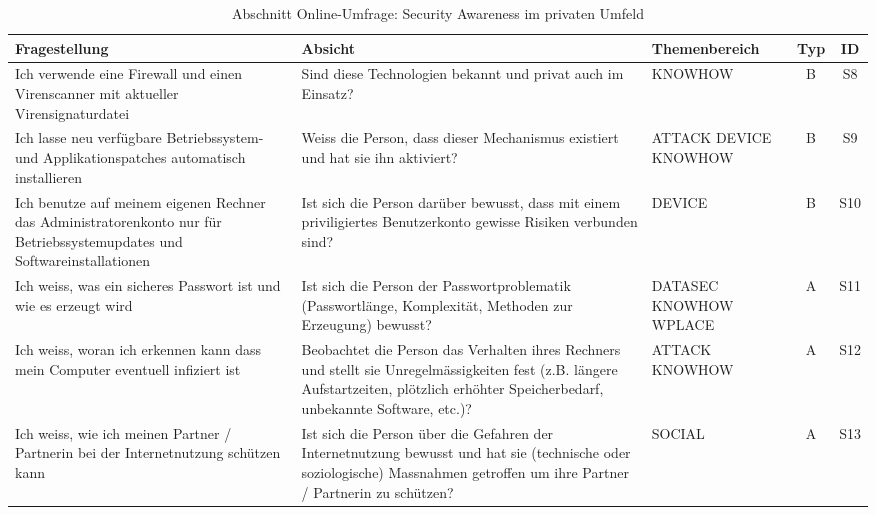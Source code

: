 \documentclass[../../main.tex]{subfiles}
\begin{document}
\sloppy 

\begin{table}[H]
\tablefontsize	
\centering
\caption{Abschnitt Online-Umfrage: Security Awareness im privaten Umfeld}
\label{Security Awareness im privaten Umfeld}
\begin{tabular}{ |p{5.5cm}|p{5.5cm}|p{2.5cm}|c|c|}

\hline
\tableheaderbgcolor
\textbf{Fragestellung} & \textbf{Absicht} & \textbf{Themenbereich} & \textbf{Typ} & \textbf{ID}\\ 
\hline
Ich verwende eine Firewall und einen Virenscanner mit aktueller Virensignaturdatei &  Sind diese Technologien bekannt und privat auch im Einsatz? & KNOWHOW & B & S8 \\
\hline

Ich lasse neu verfügbare Betriebssystem- und Applikationspatches automatisch \newline installieren &  Weiss die Person, dass dieser Mechanismus existiert und hat sie ihn aktiviert? & ATTACK \newline DEVICE \newline KNOWHOW & B & S9 \\
\hline

Ich benutze auf meinem eigenen Rechner das Administratorenkonto nur für Betriebssystemupdates und Softwareinstallationen &  Ist sich die Person darüber bewusst, dass mit einem priviligiertes Benutzerkonto gewisse Risiken verbunden sind? & DEVICE & B & S10 \\
\hline

Ich weiss, was ein sicheres Passwort ist und wie es erzeugt wird &  Ist sich die Person der Passwortproblematik (Passwortlänge, Komplexität, Methoden zur Erzeugung) bewusst? & DATASEC \newline KNOWHOW \newline WPLACE & A & S11 \\
\hline

Ich weiss, woran ich erkennen kann dass mein Computer eventuell infiziert ist &  Beobachtet die Person das Verhalten ihres Rechners und stellt sie Unregelmässigkeiten fest (z.B. längere Aufstartzeiten, plötzlich erhöhter Speicherbedarf, unbekannte Software, etc.)? & ATTACK \newline KNOWHOW & A & S12 \\
\hline

Ich weiss, wie ich meinen Partner / Partnerin bei der Internetnutzung schützen kann &  Ist sich die Person über die Gefahren der Internetnutzung bewusst und hat sie (technische oder soziologische) Massnahmen getroffen um ihre Partner / Partnerin zu schützen? & SOCIAL & A & S13 \\
\hline


\end{tabular}
\end{table}
\end{document}
